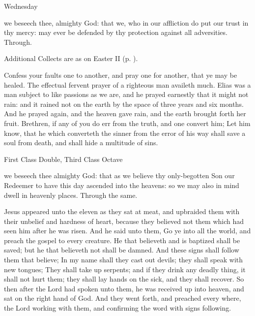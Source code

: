 \begin{inhead}
    Wednesday
\end{inhead}

\collect
{} we beseech thee, almighty God: that we, who in our affliction do put our trust in thy mercy: may ever be defended by thy protection against all adversities. Through.
\begin{rubric}
    Additional Collects are as on Easter II (p. \pageref{EasterII}).
\end{rubric}

 Confess your faults one to another, and pray one for another, that ye may be healed. The effectual fervent prayer of a righteous man availeth much. Elias was a man subject to like passions as we are, and he prayed earnestly that it might not rain: and it rained not on the earth by the space of three years and six months. And he prayed again, and the heaven gave rain, and the earth brought forth her fruit. Brethren, if any of you do err from the truth, and one convert him; Let him know, that he which converteth the sinner from the error of his way shall save a soul from death, and shall hide a multitude of sins.

\begin{inhead}
    {First Class Double, Third Class Octave}
\end{inhead}

\collect
{} we beseech thee almighty God: that as we believe thy only-begotten Son our Redeemer to have this day ascended into the heavens: so we may also in mind dwell in heavenly places. Through the same.

 Jesus appeared unto the eleven as they sat at meat, and upbraided them with their unbelief and hardness of heart, because they believed not them which had seen him after he was risen. And he said unto them, Go ye into all the world, and preach the gospel to every creature. He that believeth and is baptized shall be saved; but he that believeth not shall be damned. And these signs shall follow them that believe; In my name shall they cast out devils; they shall speak with new tongues; They shall take up serpents; and if they drink any deadly thing, it shall not hurt them; they shall lay hands on the sick, and they shall recover. So then after the Lord had spoken unto them, he was received up into heaven, and sat on the right hand of God. And they went forth, and preached every where, the Lord working with them, and confirming the word with signs following.


